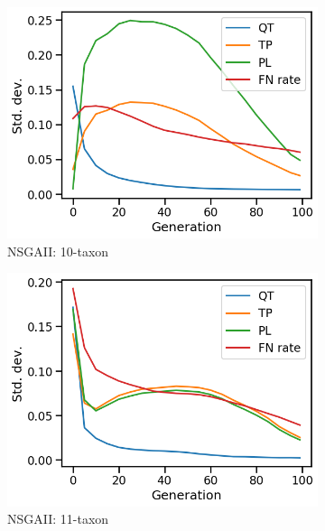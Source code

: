 \begin{figure}[!htbp]
	\centering
		\begin{subfigure}[b]{0.3\textwidth}
			\includegraphics[width=\textwidth]{Figure/10-taxon_NSGAII_std_dev}
			\caption{NSGAII: 10-taxon}
		\end{subfigure}%
		\begin{subfigure}[b]{0.3\textwidth}
			\includegraphics[width=\textwidth]{Figure/11-taxon_NSGAII_std_dev}
			\caption{NSGAII: 11-taxon}
		\end{subfigure}%
		\begin{subfigure}[b]{0.3\textwidth}

\end{subfigure}
\end{figure}
